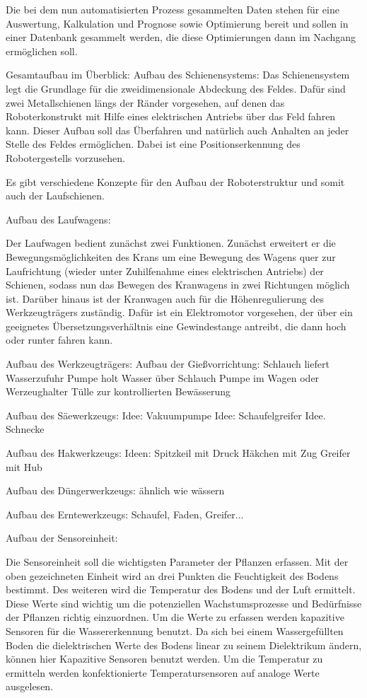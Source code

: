 \documentclass[]{article}
\begin{document}
Die bei dem nun automatisierten Prozess gesammelten Daten stehen für eine Auswertung, Kalkulation und Prognose sowie Optimierung bereit und sollen in einer Datenbank gesammelt werden, die diese Optimierungen dann im Nachgang ermöglichen soll.

Gesamtaufbau im Überblick:
Aufbau des Schienensystems:
Das Schienensystem legt die Grundlage für die zweidimensionale Abdeckung des Feldes. Dafür sind zwei Metallschienen längs der Ränder vorgesehen, auf denen das Roboterkonstrukt mit Hilfe eines elektrischen Antriebs über das Feld fahren kann. Dieser Aufbau soll das Überfahren und natürlich auch Anhalten an jeder Stelle des Feldes ermöglichen. Dabei ist eine Positionserkennung des Robotergestells vorzusehen.

Es gibt verschiedene Konzepte für den Aufbau der Roboterstruktur und somit auch der Laufschienen. 

Aufbau des Laufwagens: 

Der Laufwagen bedient zunächst zwei Funktionen. Zunächst erweitert er die Bewegungsmöglichkeiten des Krans um eine Bewegung des Wagens quer zur Laufrichtung (wieder unter Zuhilfenahme eines elektrischen Antriebs) der Schienen, sodass nun das Bewegen des Kranwagens in zwei Richtungen möglich ist. 
Darüber hinaus ist der Kranwagen auch für die Höhenregulierung des Werkzeugträgers zuständig. Dafür ist ein Elektromotor vorgesehen, der über ein geeignetes Übersetzungsverhältnis eine Gewindestange antreibt, die dann hoch oder runter fahren kann. 


Aufbau des Werkzeugträgers:
Aufbau der Gießvorrichtung:
Schlauch liefert Wasserzufuhr
Pumpe holt Wasser über Schlauch
Pumpe im Wagen oder Werzeughalter
Tülle zur kontrollierten Bewässerung

Aufbau des Säewerkzeugs:
Idee: Vakuumpumpe
Idee: Schaufelgreifer
Idee. Schnecke

Aufbau des Hakwerkzeugs:
Ideen:
Spitzkeil mit Druck
Häkchen mit Zug
Greifer mit Hub

Aufbau des Düngerwerkzeugs:
ähnlich wie wässern 


Aufbau des Erntewerkzeugs:
Schaufel, Faden, Greifer...

Aufbau der Sensoreinheit:

Die Sensoreinheit soll die wichtigsten Parameter der Pflanzen erfassen. Mit der oben gezeichneten Einheit wird an drei Punkten die Feuchtigkeit des Bodens bestimmt. Des weiteren wird die Temperatur des Bodens und der Luft ermittelt. Diese Werte sind wichtig um die potenziellen Wachstumsprozesse und Bedürfnisse der Pflanzen richtig einzuordnen.
Um die Werte zu erfassen werden kapazitive Sensoren für die Wassererkennung benutzt. Da sich bei einem Wassergefüllten Boden die dielektrischen Werte des Bodens linear zu seinem Dielektrikum ändern, können hier Kapazitive Sensoren benutzt werden. Um die Temperatur zu ermitteln werden konfektionierte Temperatursensoren auf analoge Werte ausgelesen. 
\end{document}
